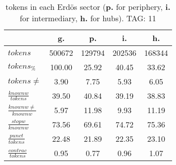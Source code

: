 \begin{table}[h!]
\begin{center}
\begin{tabular}{| l || c | c | c | c |}\hline
 & {\bf g.} & {\bf p.} & {\bf i.} & {\bf h.} \\\hline\hline
$tokens$ & 500672  & 129794  & 202536  & 168344 \\
$tokens_{\%}$ & 100.00  & 25.92  & 40.45  & 33.62 \\
$tokens \neq$ & 3.90  & 7.75  & 5.93  & 6.05 \\\hline
$\frac{knownw}{tokens}$ & 39.50  & 40.84  & 39.19  & 38.83 \\
$\frac{knownw \neq}{knownw}$ & 5.97  & 11.98  & 9.93  & 11.19 \\\hline
$\frac{stopw}{knownw}$ & 73.56  & 69.61  & 74.72  & 75.36 \\
$\frac{punct}{tokens}$ & 22.48  & 21.89  & 22.35  & 23.10 \\
$\frac{contrac}{tokens}$ & 0.95  & 0.77  & 0.96  & 1.07 \\\hline
\end{tabular}
\caption{tokens in each Erd\"os sector ({{\bf p.}} for periphery, {{\bf i.}} for intermediary, 
    {{\bf h.}} for hubs). TAG: 11}
\end{center}
\end{table}